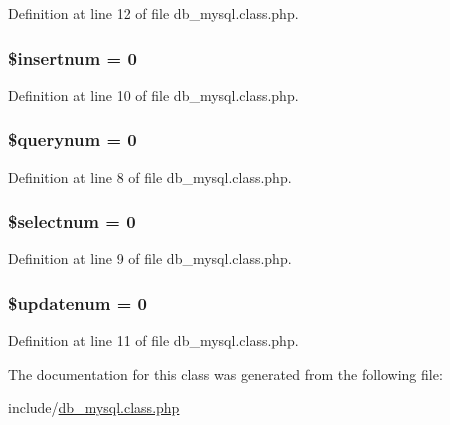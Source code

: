 Definition at line 12 of file db\+\_\+mysql.\+class.\+php.

\hypertarget{classdbstuff_a232c3cd31f369358e47b8faaa3d364d3}{
\subsubsection[{\$insertnum}]{\setlength{\rightskip}{0pt plus 5cm}\$insertnum = 0}}\label{classdbstuff_a232c3cd31f369358e47b8faaa3d364d3}


Definition at line 10 of file db\+\_\+mysql.\+class.\+php.

\hypertarget{classdbstuff_aa48660dc81aca1df4d66ba6f6bcc5d32}{
\subsubsection[{\$querynum}]{\setlength{\rightskip}{0pt plus 5cm}\$querynum = 0}}\label{classdbstuff_aa48660dc81aca1df4d66ba6f6bcc5d32}


Definition at line 8 of file db\+\_\+mysql.\+class.\+php.

\hypertarget{classdbstuff_a7cdd79fa4be830e3f84d5aacd9e224a5}{
\subsubsection[{\$selectnum}]{\setlength{\rightskip}{0pt plus 5cm}\$selectnum = 0}}\label{classdbstuff_a7cdd79fa4be830e3f84d5aacd9e224a5}


Definition at line 9 of file db\+\_\+mysql.\+class.\+php.

\hypertarget{classdbstuff_ab62c1d782ea6e6d94b03f9edf4e0f147}{
\subsubsection[{\$updatenum}]{\setlength{\rightskip}{0pt plus 5cm}\$updatenum = 0}}\label{classdbstuff_ab62c1d782ea6e6d94b03f9edf4e0f147}


Definition at line 11 of file db\+\_\+mysql.\+class.\+php.



The documentation for this class was generated from the following file\+:\begin{DoxyCompactItemize}
\item 
include/\hyperlink{db__mysql_8class_8php}{db\+\_\+mysql.\+class.\+php}\end{DoxyCompactItemize}
